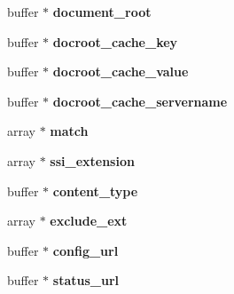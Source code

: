 \begin{CompactItemize}
\item 
\hypertarget{structplugin__config_1e881c816cbb849873b45a53c6937f4c}{
buffer $\ast$ \textbf{document\_\-root}}
\label{structplugin__config_1e881c816cbb849873b45a53c6937f4c}

\item 
\hypertarget{structplugin__config_ced1c921d3daf96fb443821f19420a98}{
buffer $\ast$ \textbf{docroot\_\-cache\_\-key}}
\label{structplugin__config_ced1c921d3daf96fb443821f19420a98}

\item 
\hypertarget{structplugin__config_200b47985e662bd13047a2118952e62e}{
buffer $\ast$ \textbf{docroot\_\-cache\_\-value}}
\label{structplugin__config_200b47985e662bd13047a2118952e62e}

\item 
\hypertarget{structplugin__config_76c0e6a6dc25c344441e75feeb7b673f}{
buffer $\ast$ \textbf{docroot\_\-cache\_\-servername}}
\label{structplugin__config_76c0e6a6dc25c344441e75feeb7b673f}

\item 
\hypertarget{structplugin__config_7a3c933dffd1f29673281c093373acf6}{
array $\ast$ \textbf{match}}
\label{structplugin__config_7a3c933dffd1f29673281c093373acf6}

\item 
\hypertarget{structplugin__config_3a055b2a593ee988adf29f98b3524475}{
array $\ast$ \textbf{ssi\_\-extension}}
\label{structplugin__config_3a055b2a593ee988adf29f98b3524475}

\item 
\hypertarget{structplugin__config_8c7734d100c6746915cdce4b36696f9d}{
buffer $\ast$ \textbf{content\_\-type}}
\label{structplugin__config_8c7734d100c6746915cdce4b36696f9d}

\item 
\hypertarget{structplugin__config_2cf350729e68bc790cdf2ecfa10107b5}{
array $\ast$ \textbf{exclude\_\-ext}}
\label{structplugin__config_2cf350729e68bc790cdf2ecfa10107b5}

\item 
\hypertarget{structplugin__config_72d94ba8d09b9d0c19d225f804783ea0}{
buffer $\ast$ \textbf{config\_\-url}}
\label{structplugin__config_72d94ba8d09b9d0c19d225f804783ea0}

\item 
\hypertarget{structplugin__config_44b94ae3dac658262e9900c15f20c185}{
buffer $\ast$ \textbf{status\_\-url}}
\label{structplugin__config_44b94ae3dac658262e9900c15f20c185}


\end{CompactItemize}
